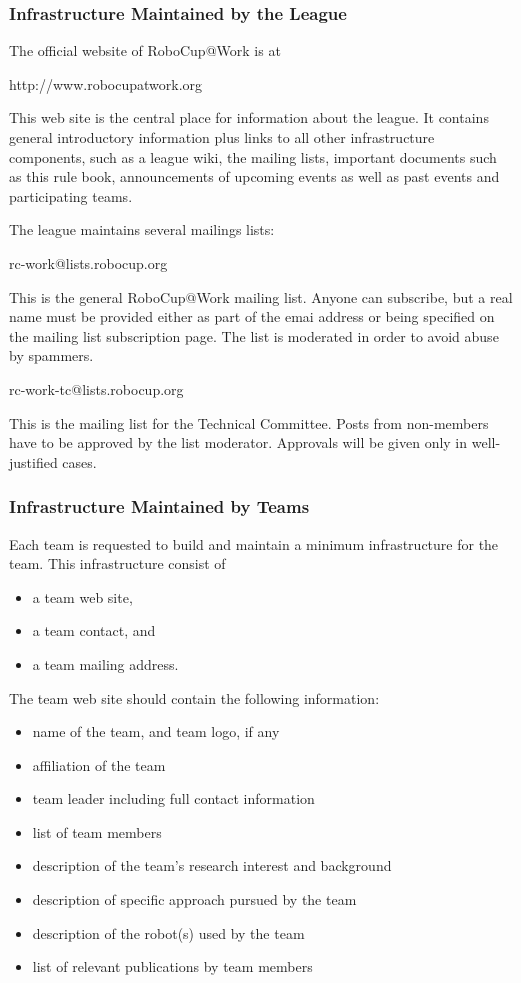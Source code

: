 \subsubsection{Infrastructure Maintained by the League}
The official website of RoboCup@Work is at

http://www.robocupatwork.org

This web site is the central place for information about the league. It contains general introductory information plus links to all other infrastructure components, such as a league wiki, the mailing lists, important documents such as this rule book, announcements of upcoming events as well as past events and participating teams.
\par
The league maintains several mailings lists:
\par
rc-work@lists.robocup.org
\par
This is the general RoboCup@Work mailing list. Anyone can subscribe, but a real name must be provided either as part of the emai address or being specified on the mailing list subscription page. The list is moderated in order to avoid abuse by spammers. 
\par
rc-work-tc@lists.robocup.org
\par
This is the mailing list for the Technical Committee. Posts from non-members have to be approved by the list moderator. Approvals will be given only in well-justified cases.

\subsubsection{Infrastructure Maintained by Teams}
Each team is requested to build and maintain a minimum infrastructure for the team. This infrastructure consist of 

\begin{itemize}
	\item a team web site,
	\item a team contact, and
	\item a team mailing address.
\end{itemize}

The team web site should contain the following information:

\begin{itemize}
	\item name of the team, and team logo, if any
	\item affiliation of the team
	\item team leader including full contact information
	\item list of team members
	\item description of the team’s research interest and background
	\item description of specific approach pursued by the team
	\item description of the robot(s) used by the team
	\item list of relevant publications by team members

\end{itemize}

